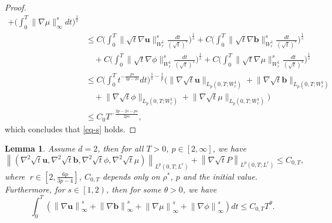 \documentclass[11pt]{article}
\newtheorem{lemma}[theorem]{Lemma}
\numberwithin{equation}{section}
\begin{document}
\begin{proof}
\begin{equation*}
\begin{split}
+\big( \int_0^T \big\lVert \nabla\mu \big\rVert_\infty^s dt \big)^{\frac{1}{s}}  \\
&\leq C \big( \int_0^T \big\lVert \sqrt{t} \nabla \mathbf{u} \big\rVert_{W_r^1}^s \frac{dt}{(\sqrt{t})^s} \big)^{\frac{1}{s}} + C \big( \int_0^T \big\lVert \sqrt{t} \nabla \mathbf{b} \big\rVert_{W_r^1}^s \frac{dt}{(\sqrt{t})^s} \big)^{\frac{1}{s}} \\&\quad+ C \big( \int_0^T \big\lVert \sqrt{t} \nabla \phi \big\rVert_{W_r^1}^s \frac{dt}{(\sqrt{t})^s} \big)^{\frac{1}{s}}
+C \big( \int_0^T \big\lVert \sqrt{t} \nabla \mu \big\rVert_{W_r^1}^s \frac{dt}{(\sqrt{t})^s} \big)^{\frac{1}{s}} \\
&\leq C \big( \int_0^T t^{-\frac{ps}{2p - 2s}} dt \big)^{\frac{1}{s} - \frac{1}{p}} \big( \big\lVert \nabla \sqrt{t} \mathbf{u} \big\rVert_{L_p(0,T;W_r^1)} + \big\lVert \nabla \sqrt{t} \mathbf{b} \big\rVert_{L_p(0,T;W_r^1)} \\&\quad+ \big\lVert \nabla \sqrt{t} \phi \big\rVert_{L_p(0,T;W_r^1)}+\big\lVert \nabla \sqrt{t} \mu \big\rVert_{L_p(0,T;W_r^1)}  \big) \\
&\leq C_{0} T^{-\frac{2p - 2s - ps}{2ps}},
\end{split}
\end{equation*}
which concludes that \eqref{eq-s} holds.
\end{proof}
\begin{lemma}
Assume \( d = 2 \), then for all \( T > 0 \), \( p \in [2,\infty] \),  we have
\begin{equation}
\left\lVert (\nabla^2 \sqrt{t} \mathbf{u}, \nabla^2 \sqrt{t} \mathbf{b}, \nabla^2 \sqrt{t}\phi, \nabla^2 \sqrt{t} \mu) \right\rVert_{L^p(0,T;L^{r})} + \left\lVert \nabla \sqrt{t} P \right\rVert_{L^p(0,T;L^{r})} \leq C_{0,T},\label{eq-r}
\end{equation}
where $\ r \in [2,\frac{6p}{3p - 4}]$, \( C_{0,T} \) depends only on \( \rho^* \), \( p \) and the initial value. Furthermore, for \( s \in \left[1,2\right) \), then for some \( \theta > 0 \), we have
\begin{equation}
\int_0^T \left( \left\lVert \nabla \mathbf{u} \right\rVert_\infty^s +\left\lVert \nabla \mathbf{b} \right\rVert_\infty^s + \left\lVert \nabla \mu\right\rVert_\infty^s + \left\lVert \nabla\phi \right\rVert_\infty^s \right) dt \leq C_{0,T} T^\theta.\label{eq-x}
\end{equation}
\end{lemma}
\end{document}
